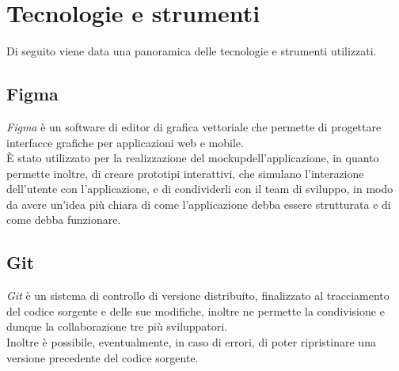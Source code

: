 


\section{Tecnologie e strumenti}
\label{sec:tecnologie-strumenti}
Di seguito viene data una panoramica delle tecnologie e strumenti utilizzati.

\subsection*{Figma}
\emph{Figma}\cite{site:figma} è un software di editor di grafica vettoriale che permette di progettare interfacce grafiche per applicazioni web e mobile.\\
È stato utilizzato per la realizzazione del \gls{mockup}\glsoccur dell'applicazione, in quanto permette inoltre, di creare prototipi interattivi, che simulano l'interazione dell'utente con l'applicazione, e di condividerli con il team di sviluppo, in modo da avere un'idea più chiara di come l'applicazione debba essere strutturata e di come debba funzionare.\\

\subsection*{Git}
\emph{Git}\cite{site:git} è un sistema di controllo di versione distribuito, finalizzato al tracciamento del codice sorgente e delle sue modifiche, inoltre ne permette la condivisione e dunque la collaborazione tre più sviluppatori.\\
Inoltre è possibile, eventualmente, in caso di errori, di poter ripristinare una versione precedente del codice sorgente.\\

